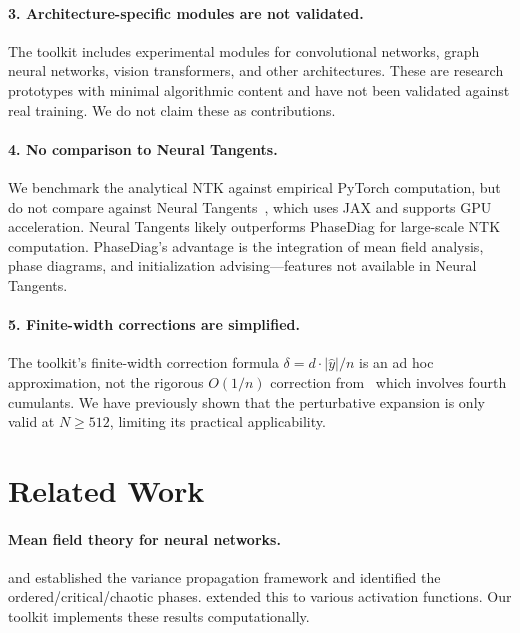 \documentclass[10pt]{article}
\theoremstyle{definition}
\begin{document}
\paragraph{3. Architecture-specific modules are not validated.}
The toolkit includes experimental modules for convolutional networks, graph neural networks, vision transformers, and other architectures.
These are research prototypes with minimal algorithmic content and have not been validated against real training.
We do not claim these as contributions.

\paragraph{4. No comparison to Neural Tangents.}
We benchmark the analytical NTK against empirical PyTorch computation, but do not compare against Neural Tangents~\citep{novak2019neural}, which uses JAX and supports GPU acceleration.
Neural Tangents likely outperforms PhaseDiag for large-scale NTK computation.
PhaseDiag's advantage is the integration of mean field analysis, phase diagrams, and initialization advising---features not available in Neural Tangents.

\paragraph{5. Finite-width corrections are simplified.}
The toolkit's finite-width correction formula $\delta = d \cdot |\hat{y}| / n$ is an ad hoc approximation, not the rigorous $O(1/n)$ correction from~\citet{dyer2020asymptotics} which involves fourth cumulants.
We have previously shown that the perturbative expansion is only valid at $N \geq 512$, limiting its practical applicability.

\section{Related Work}
\label{sec:related}

\paragraph{Mean field theory for neural networks.}
\citet{poole2016exponential} and \citet{schoenholz2017deep} established the variance propagation framework and identified the ordered/critical/chaotic phases.
\citet{hayou2019impact} extended this to various activation functions.
Our toolkit implements these results computationally.
\end{document}
